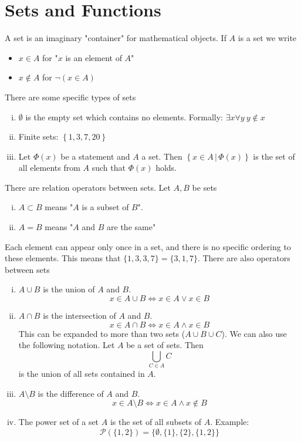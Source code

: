 \documentclass[../../script.tex]{subfiles}
\begin{document}
\section{Sets and Functions}
\begin{defi}
A set is an imaginary "container" for mathematical objects. If $A$ is a set we write
\begin{itemize}
	\item $x \in A$ for "$x$ is an element of $A$"
	\item $x \notin A$ for $\neg (x \in A)$
\end{itemize}
There are some specific types of sets
\begin{enumerate}[(i)]
	\item $\emptyset$ is the empty set which contains no elements. Formally: $\exists x \forall y ~y\notin x$
	\item Finite sets: $\left\{1, 3, 7, 20\right\}$
	\item Let $\Phi(x)$ be a statement and $A$ a set. Then $\left\{x \in A \,\vert\, \Phi(x)\right\}$ is the set of all elements from $A$ such that $\Phi(x)$ holds.
\end{enumerate}
There are relation operators between sets. Let $A, B$ be sets
\begin{enumerate}[(i)]
	\item $A \subset B$ means "$A$ is a subset of $B$".
	\item $A = B$ means "$A$ and $B$ are the same"
\end{enumerate}
Each element can appear only once in a set, and there is no specific ordering to these elements. This means that $\{1, 3, 3, 7\} = \{3, 1, 7\}$. There are also operators between sets
\begin{enumerate}[(i)]
	\item $A \cup B$ is the union of $A$ and $B$. 
	\[
		x \in A \cup B \iff x \in A \vee x \in B
	\]
	\item $A \cap B$ is the intersection of $A$ and $B$.
	\[
		x \in A \cap B \iff x \in A \wedge x \in B
	\]
	This can be expanded to more than two sets ($A \cup B \cup C$). We can also use the following notation. Let $A$ be a set of sets. Then
	\[
		\bigcup_{C \in A} C
	\]
	is the union of all sets contained in $A$.
	\item $A \setminus B$ is the difference of $A$ and $B$.
	\[
		x \in A \setminus B \iff x \in A \wedge x \notin B
	\]
	\item The power set of a set $A$ is the set of all subsets of $A$. Example:
	\[
		\mathcal{P}(\{1, 2\}) = \{\emptyset, \{1\}, \{2\}, \{1, 2\}\}
	\]
\end{enumerate}
\end{defi}
\end{document}
